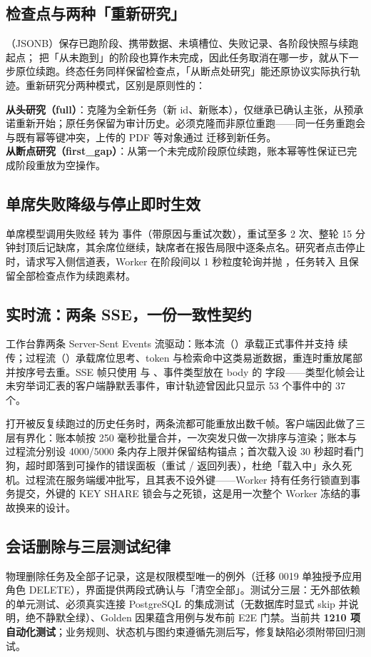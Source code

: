 \subsection{检查点与两种「重新研究」}

（JSONB）保存已跑阶段、携带数据、未填槽位、失败记录、各阶段快照与续跑起点； 把「从未跑到」的阶段也算作未完成，因此任务取消在哪一步，就从下一步原位续跑。终态任务同样保留检查点，「从断点处研究」能还原协议实际执行轨迹。重新研究分两种模式，区别是原则性的：

\begin{mechbox}
\textbf{从头研究（full）}：克隆为全新任务（新 id、新账本），仅继承已确认主张，从预承诺重新开始；原任务保留为审计历史。必须克隆而非原位重跑——同一任务重跑会与既有幂等键冲突，上传的 PDF 等对象通过  迁移到新任务。\\[4pt]
\textbf{从断点研究（first\_gap）}：从第一个未完成阶段原位续跑，账本幂等性保证已完成阶段重放为空操作。
\end{mechbox}

\subsection{单席失败降级与停止即时生效}

单席模型调用失败经  转为  事件（带原因与重试次数），重试至多 2 次、整轮 15 分钟封顶后记缺席，其余席位继续，缺席者在报告局限中逐条点名。研究者点击停止时，请求写入侧信道表，Worker 在阶段间以 1 秒粒度轮询并抛 ，任务转入  且保留全部检查点作为续跑素材。

\subsection{实时流：两条 SSE，一份一致性契约}

工作台靠两条 Server-Sent Events 流驱动：账本流（）承载正式事件并支持  续传；过程流（）承载席位思考、token 与检索命中这类易逝数据，重连时重放尾部并按序号去重。SSE 帧只使用  与 、事件类型放在 body 的  字段——类型化帧会让未穷举词汇表的客户端静默丢事件，审计轨迹曾因此只显示 53 个事件中的 37 个。

打开被反复续跑过的历史任务时，两条流都可能重放出数千帧。客户端因此做了三层有界化：账本帧按 250 毫秒批量合并，一次突发只做一次排序与渲染；账本与过程流分别设 4000/5000 条内存上限并保留结构锚点；首次载入设 30 秒超时看门狗，超时即落到可操作的错误面板（重试 / 返回列表），杜绝「载入中」永久死机。过程流在服务端缓冲批写，且其表不设外键——Worker 持有任务行锁直到事务提交，外键的 KEY SHARE 锁会与之死锁，这是用一次整个 Worker 冻结的事故换来的设计。

\subsection{会话删除与三层测试纪律}

 物理删除任务及全部子记录，这是权限模型唯一的例外（迁移 0019 单独授予应用角色 DELETE），界面提供两段式确认与「清空全部」。测试分三层：无外部依赖的单元测试、必须真实连接 PostgreSQL 的集成测试（无数据库时显式 skip 并说明，绝不静默全绿）、Golden 因果蕴含用例与发布前 E2E 门禁。当前共 \textbf{1210 项自动化测试}；业务规则、状态机与图约束遵循先测后写，修复缺陷必须附带回归测试。
